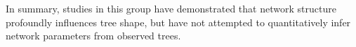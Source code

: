 In summary, studies in this group have demonstrated that network structure
profoundly influences tree shape, but have not attempted to quantitatively
infer network parameters from observed trees.


%
%
